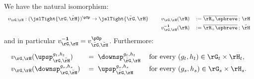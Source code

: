 \documentclass{article}
\begin{document}
\begin{theorem}
\item
We have the natural isomorphism:
\[
\begin{tabular}{llll}
$v_{\rG,\rH} : (\jslTight{\rG,\breve{\rH}})^{\pOp} \to \jslTight{\breve{\rG},\rH}$
&&
$v_{\rG,\rH} (\rR)$
& $:= \overline{\rR_+\spbreve} \, ; \, \rH$
\\[1ex] &&
$v_{\rG,\rH}^{\bf-1}(\rR)$
& $:= \overline{\rR_+\spbreve} \, ; \, \breve{\rH}$
\end{tabular}
\]
and in particular $v_{\rG,\rH}^{\bf-1} = v_{\breve{\rG},\breve{\rH}}^{\pOp}$. Furthermore:
\[
\begin{tabular}{lll}
$v_{\rG,\rH}(\upsp_{\rG,\breve{\rH}}^{g_t,h_t})$
&
$=  \;\downsp_{\breve{\rG},\rH}^{g_t,h_t}$
& for every $(g_t,h_t) \in \rG_t \times \rH_t$,
\\[1ex]
$v_{\rG,\rH}(\downsp_{\rG,\breve{\rH}}^{g_s,h_s})$
&
$=  \;\upsp_{\breve{\rG},\rH}^{g_s,h_s}$
& for every $(g_s,h_s) \in \rG_s \times \rH_s$.
\end{tabular}
\]
\end{theorem}
\end{document}
